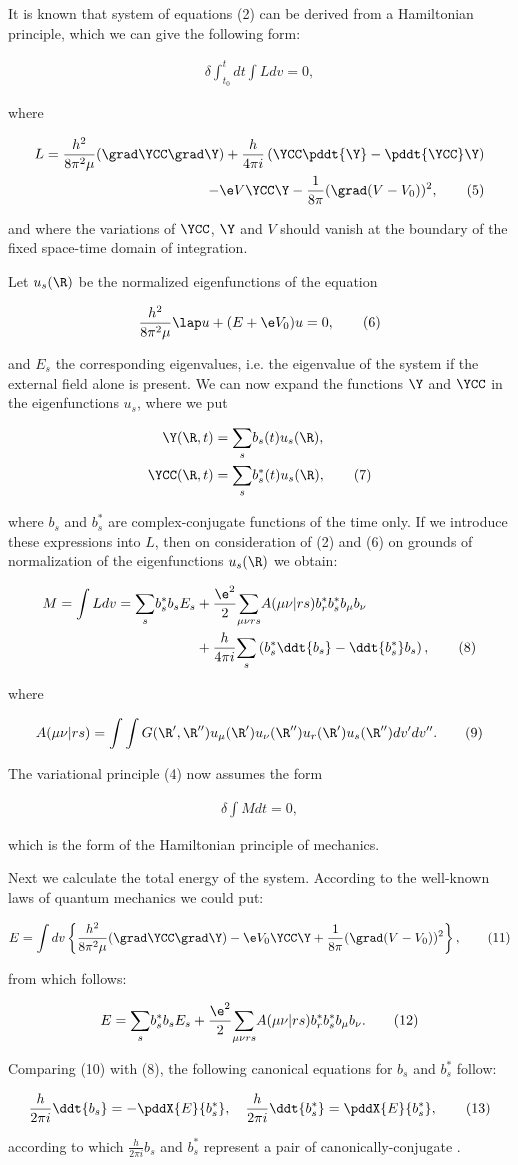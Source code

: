 \documentclass{article}
\newcommand{\nequ}[2]{
\begin{align*}
#1
\tag{#2}
\end{align*}
}
\newcommand{\sumX}[1]{\underset{#1}{\sum}}
\newcommand{\intXY}[2]{\int_{#1}^{#2}}
\begin{document}
It is known that system of equations (2) can be derived from a Hamiltonian principle, which we can give the following form:

\nequ{
\delta\intXY{t_0}{t}dt\int L dv = 0,
}{4}

where
\nequ{
L = \frac{h^2}{8\pi^2\mu}(\grad\YCC \grad\Y) + \frac{h}{4\pi i}\left(\YCC\pddt{\Y} - \pddt{\YCC}\Y\right) \\
- \e V \YCC\Y - \frac{1}{8\pi}(\grad(V-V_0))^2,
}{5}
and where the variations of $\YCC$, $\Y$ and $V$ should vanish at the boundary of the fixed  space-time domain of integration.

Let $u_s(\R)$ be the normalized eigenfunctions of the equation
\nequ{
\frac{h^2}{8\pi^2\mu}\lap u + (E + \e V_0)u = 0,
}{6}
and $E_s$ the corresponding eigenvalues, i.e. the eigenvalue of the system if the external field alone is present. We can now expand the functions $\Y$ and $\YCC$ in the eigenfunctions $u_s$, where we put
\nequ{
\Y(\R,t) &= \sumX{s} b_s(t)u_s(\R),\\
\YCC(\R,t) &= \sumX{s} b^*_s(t)u_s(\R),
}{7}
where $b_s$ and $b^*_s$ are complex-conjugate functions of the time only. If we introduce these expressions into $L$, then on consideration of (2) and (6) on grounds of normalization of the eigenfunctions $u_s(\R)$ we obtain:
\nequ{
M = \int L dv = \sumX{s} b^*_s b_s E_s &+ \frac{\e^2}{2} \sumX{\mu\nu r s}A(\mu\nu | r s)b^*_r b^*_s b_\mu b_\nu \\
& + \frac{h}{4\pi i}\sumX{s}\left(b^*_s\ddt{b_s} - \ddt{b^*_s}b_s\right),
}{8}
where
\nequ{
A(\mu\nu|r s) = \int\int G(\R',\R'')u_\mu(\R')u_\nu(\R'')u_r(\R')u_s(\R'')dv'dv''.
}{9}

The variational principle (4) now assumes the form
\nequ{
\delta\int M dt = 0,
}{10}
which is the form of the Hamiltonian principle of mechanics.

Next we calculate the total energy of the system. According to the well-known laws of quantum mechanics we could put:
\nequ{
E = \int dv \left\{ \frac{h^2}{8\pi^2\mu} (\grad\YCC \grad\Y) - \e V_0\YCC\Y
  + \frac{1}{8\pi}(\grad(V-V_0))^2 \right\},
}{11}
from which follows:
\nequ{
E = \sumX{s}b^*_s b_s E_s + \frac{\e^2}{2} \sumX{\mu\nu r s}A(\mu\nu | r s) b^*_r b^*_s b_\mu b_\nu .
}{12}

Comparing (10) with (8), the following canonical equations for $b_s$ and $b^*_s$ follow:
\nequ{
\frac{h}{2\pi i}\ddt{b_s} = -\pddX{E}{b^*_s},\quad
\frac{h}{2\pi i}\ddt{b^*_s} = \pddX{E}{b^*_s},
}{13}
according to which $\frac{h}{2 \pi i}b_s$ and $b^*_s$ represent a pair of canonically-conjugate .
\end{document}
